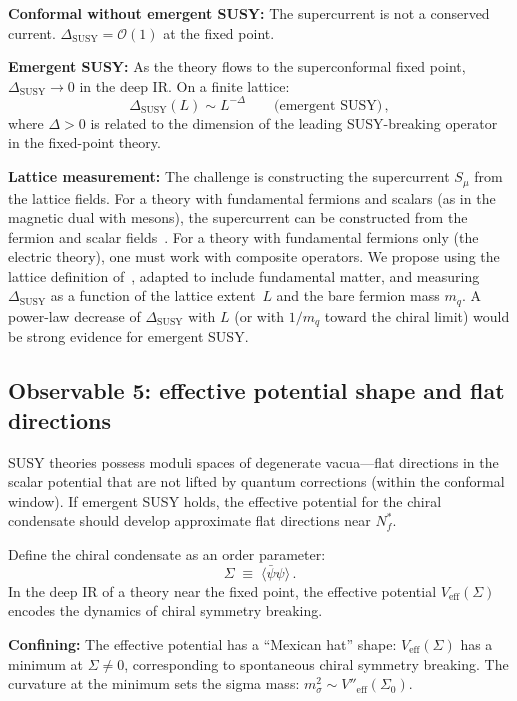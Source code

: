 \documentclass[11pt,a4paper]{article}
\theoremstyle{plain}
\theoremstyle{definition}
\theoremstyle{remark}
\newcommand{\Nf}{N_{\!f}}
\newcommand{\Nfstar}{\Nf^*}
\begin{document}
\textbf{Conformal without emergent SUSY:}  The supercurrent is not a
conserved current.  $\Delta_{\mathrm{SUSY}} = \mathcal{O}(1)$ at the
fixed point.

\textbf{Emergent SUSY:}  As the theory flows to the superconformal
fixed point, $\Delta_{\mathrm{SUSY}} \to 0$ in the deep IR.  On a
finite lattice:
\begin{equation}\label{eq:WI-scaling}
  \Delta_{\mathrm{SUSY}}(L) \sim L^{-\Delta}
  \qquad\text{(emergent SUSY)}\,,
\end{equation}
where $\Delta > 0$ is related to the dimension of the leading
SUSY-breaking operator in the fixed-point theory.

\textbf{Lattice measurement:}  The challenge is constructing the
supercurrent $S_\mu$ from the lattice fields.  For a theory with
fundamental fermions and scalars (as in the magnetic dual with
mesons), the supercurrent can be constructed from the fermion and
scalar fields~\cite{DESY2008}.  For a theory with fundamental fermions
only (the electric theory), one must work with composite operators.
We propose using the lattice definition of~\cite{Munster2014},
adapted to include fundamental matter, and measuring
$\Delta_{\mathrm{SUSY}}$ as a function of the lattice extent~$L$ and
the bare fermion mass $m_q$.  A power-law decrease of
$\Delta_{\mathrm{SUSY}}$ with $L$ (or with $1/m_q$ toward the chiral
limit) would be strong evidence for emergent SUSY.


\subsection{Observable 5: effective potential shape and flat directions}
\label{ssec:obs5}

SUSY theories possess moduli spaces of degenerate vacua---flat
directions in the scalar potential that are not lifted by quantum
corrections (within the conformal window).  If emergent SUSY holds, the
effective potential for the chiral condensate should develop approximate
flat directions near $\Nfstar$.

Define the chiral condensate as an order parameter:
\begin{equation}\label{eq:chiral-condensate}
  \Sigma \;\equiv\; \langle\bar\psi\psi\rangle\,.
\end{equation}
In the deep IR of a theory near the fixed point, the effective
potential $V_{\mathrm{eff}}(\Sigma)$ encodes the dynamics of chiral
symmetry breaking.

\textbf{Confining:}  The effective potential has a ``Mexican hat''
shape: $V_{\mathrm{eff}}(\Sigma)$ has a minimum at $\Sigma \neq 0$,
corresponding to spontaneous chiral symmetry breaking.  The curvature
at the minimum sets the sigma mass: $m_\sigma^2 \sim
V''_{\mathrm{eff}}(\Sigma_0)$.
\end{document}

